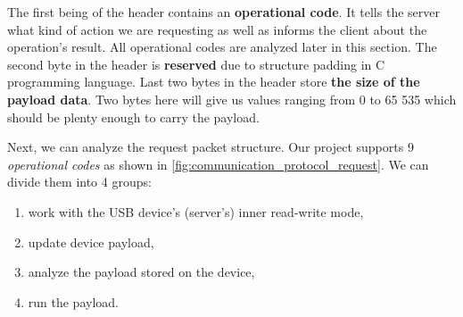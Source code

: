 The first being of the header contains an \textbf{operational code}. It tells the server what kind of action we are requesting as well as informs the client about the operation's result. All operational codes are analyzed later in this section. The second byte in the header is \textbf{reserved} due to structure padding in C programming language\cite{KernighanBrianW.1988TCpl}. Last two bytes in the header store \textbf{the size of the payload data}. Two bytes here will give us values ranging from 0 to 65 535 which should be plenty enough to carry the payload.

Next, we can analyze the request packet structure. Our project supports 9 \emph{operational codes} as shown in \autoref{fig:communication_protocol_request}. We can divide them into 4 groups:

\begin{enumerate}
    \item work with the USB device's (server's) inner read-write mode,
    \item update device payload,
    \item analyze the payload stored on the device,
    \item run the payload.
\end{enumerate}

